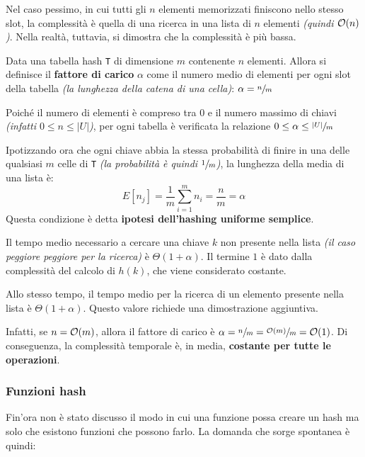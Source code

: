 \documentclass[italian, 10pt]{article}
\begin{document}
\bigskip
Nel caso pessimo, in cui tutti gli \(n\) elementi memorizzati finiscono nello stesso slot, la complessità è quella di una ricerca in una lista di \(n\) elementi \textit{(quindi \(\mathcal{O}(n)\))}.
Nella realtà, tuttavia, si dimostra che la complessità è più bassa.

Data una tabella hash \texttt{T} di dimensione \(m\) contenente \(n\) elementi.
Allora si definisce il \textbf{fattore di carico} \(\alpha\) come il numero medio di elementi per ogni slot della tabella \textit{(la lunghezza della catena di una cella)}:
\(\alpha = \sfrac{n}{m}\)

Poiché il numero di elementi è compreso tra \(0\) e il numero massimo di chiavi \textit{(infatti \(0 \leq n \leq |U|\))}, per ogni tabella è verificata la relazione \( 0 \leq \alpha \leq \sfrac{|U|}{m} \)

\bigskip
Ipotizzando ora che ogni chiave abbia la stessa probabilità di finire in una delle qualsiasi \(m\) celle di \texttt{T} \textit{(la probabilità è quindi \(\sfrac{1}{m}\))}, la lunghezza della media di una lista è:
\[ E[n_j] = \displaystyle \dfrac{1}{m} \sum_{i=1}^{m} n_i = \dfrac{n}{m} = \alpha \]
Questa condizione è detta \textbf{ipotesi dell'hashing uniforme semplice}.

Il tempo medio necessario a cercare una chiave \(k\) non presente nella lista \textit{(il caso peggiore peggiore per la ricerca)} è \(\Theta(1 + \alpha)\).
Il termine \(1\) è dato dalla complessità del calcolo di \(h(k)\), che viene considerato costante.

\bigskip
Allo stesso tempo, il tempo medio per la ricerca di un elemento presente nella lista è \(\Theta(1+\alpha)\).
Questo valore richiede una dimostrazione aggiuntiva.

Infatti, se \(n = \mathcal{O}(m)\), allora il fattore di carico è \(\alpha = \sfrac{n}{m} = \sfrac{\mathcal{O}(m)}{m} = \mathcal{O}(1)\).
Di conseguenza, la complessità temporale è, in media, \textbf{costante per tutte le operazioni}.

\subsubsection{Funzioni hash}

Fin'ora non è stato discusso il modo in cui una funzione possa creare un hash ma solo che esistono funzioni che possono farlo.
La domanda che sorge spontanea è quindi:

\end{document}
